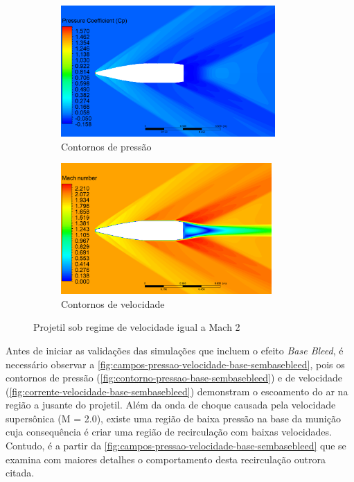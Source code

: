 \begin{figure}[!ht]
	\centering
	\begin{subfigure}[b]{0.47\textwidth}
        \centering
        \includegraphics[height=5cm,width=\textwidth]{contorno-pressao.png}
        \caption{Contornos de pressão}
        \label{fig:contorno-pressao-sembasebleed}
    \end{subfigure}
    \hfill
	\begin{subfigure}[b]{0.47\textwidth}
        \centering
        \includegraphics[height=5cm,width=\textwidth]{contorno-velocidade.png}
        \caption{Contornos de velocidade}
        \label{fig:contorno-velocidade-sembasebleed}
    \end{subfigure}
	\caption{Projetil sob regime de velocidade igual a Mach \num{2}}
	\label{fig:contornos-pressao-velocidade-sembasebleed}
\end{figure}

Antes de iniciar as validações das simulações que incluem o efeito \textit{Base Bleed}, é necessário observar a \autoref{fig:campos-pressao-velocidade-base-sembasebleed}, pois os contornos de pressão (\autoref{fig:contorno-pressao-base-sembasebleed}) e de velocidade (\autoref{fig:corrente-velocidade-base-sembasebleed}) demonstram o escoamento do ar na região a jusante do projetil. Além da onda de choque causada pela velocidade supersônica (M = \num{2,0}), existe uma região de baixa pressão na base da munição cuja consequência é criar uma região de recirculação com baixas velocidades. Contudo, é a partir da \autoref{fig:campos-pressao-velocidade-base-sembasebleed} que se examina com maiores detalhes o comportamento desta recirculação outrora citada.

